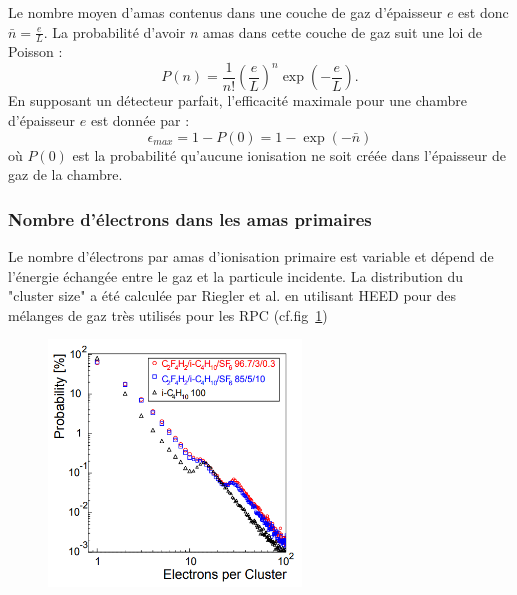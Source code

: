 Le nombre moyen d'amas contenus dans une couche de gaz d'épaisseur $e$ est donc $\bar{n}=\frac{e}{L}$. La probabilité d'avoir $n$ amas dans cette couche de gaz suit une loi de Poisson :
\begin{equation}
P(n)=\frac{1}{n!}\left(\frac{e}{L}\right)^{n}\exp\left(-\frac{e}{L}\right).
\end{equation}
En supposant un détecteur parfait, l'efficacité maximale pour une chambre d'épaisseur $e$ est donnée par :
\begin{equation}
\epsilon_{max}=1-P(0)=1-\exp\left(-\bar{n}\right)
\end{equation}
où $P(0)$ est la probabilité qu'aucune ionisation ne soit créée dans l'épaisseur de gaz de la chambre.

\subsubsection{Nombre d'électrons dans les amas primaires}
Le nombre d'électrons par amas d'ionisation primaire est variable et dépend de l'énergie échangée entre le gaz et la particule incidente. La distribution du "cluster size" a été calculée par Riegler et al. \cite{Riegler:570462} en utilisant HEED pour des mélanges de gaz très utilisés pour les RPC (cf.fig~\ref{cluster})
\begin{figure}[ht!]
	\centering
	\includegraphics[width=0.60\textwidth]{RPC/cluster.png}
	\label{cluster}
\end{figure}

